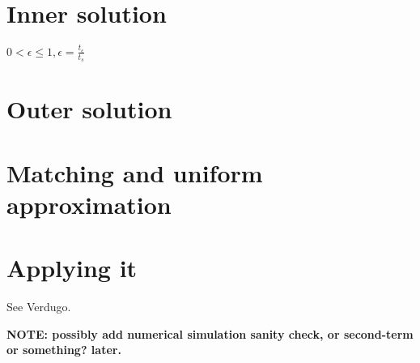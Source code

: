 \documentclass[12pt]{report}
\begin{document}
\section{Inner solution}

$0 < \epsilon \leq 1, \epsilon = \frac{t_{\epsilon}}{t_{s}}$

\section{Outer solution}

\section{Matching and uniform approximation}

\section{Applying it}

See Verdugo.

\textbf{NOTE: possibly add numerical simulation sanity check, or second-term or
something? later.}


\end{document}
